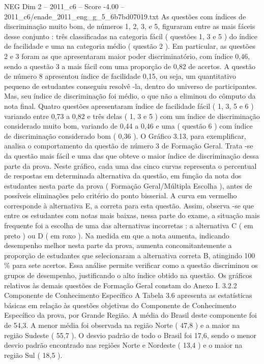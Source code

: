 \begin{textsample}{NEG Dim 2 – 2011\_c6 – Score -4.00 – 2011\_c6/enade\_2011\_eng\_g\_5\_6b7bd07019.txt}
As questões com índices de discriminação muito bom, de números 1, 2, 3, e 5, figuraram entre as mais fáceis desse conjunto : três classificadas na categoria fácil ( questões 1, 3 e 5 ) do índice de facilidade e uma na categoria médio ( questão 2 ).
Em particular, as questões 2 e 3 foram as que apresentaram maior poder discriminatório, com índice 0,46, sendo a questão 3 a mais fácil com uma proporção de 0,82 de acertos.
A questão de número 8 apresentou índice de facilidade 0,15, ou seja, um quantitativo pequeno de estudantes conseguiu resolvê -la, dentro do universo de participantes.
Mas, seu índice de discriminação foi médio, o que não a eliminou do cômputo da nota final.
Quatro questões apresentaram índice de facilidade fácil ( 1, 3, 5 e 6 ) variando entre 0,73 a 0,82 e três delas ( 1, 3 e 5 ) com um índice de discriminação considerado muito bom, variando de 0,44 a 0,46 e uma ( questão 6 ) com índice de discriminação considerado bom ( 0,36 ).
O Gráfico 3.13, para exemplificar, analisa o comportamento da questão de número 3 de Formação Geral.
Trata -se da questão mais fácil e uma das que obteve o maior índice de discriminação dessa parte da prova.
Neste gráfico, cada uma das cinco curvas representa o percentual de respostas em determinada alternativa da questão, em função da nota dos estudantes nesta parte da prova ( Formação Geral/Múltipla Escolha ), antes de possíveis eliminações pelo critério do ponto bisserial.
A curva em vermelho corresponde à alternativa E, a correta para esta questão.
Assim, observa -se que entre os estudantes com notas mais baixas, nessa parte do exame, a situação mais frequente foi a escolha de uma das alternativas incorretas : a alternativa C ( em preto ) ou D ( em roxo ).
Na medida em que a nota aumenta, indicando desempenho melhor nesta parte da prova, aumenta concomitantemente a proporção de estudantes que selecionaram a alternativa correta B, atingindo 100 \% para sete acertos.
Essa análise permite verificar como a questão discriminou os grupos de desempenho, justificando o alto índice obtido na questão.
Os gráficos relativos às demais questões de Formação Geral constam do Anexo I. 3.2.2 Componente de Conhecimento Específico A Tabela 3.6 apresenta as estatísticas básicas em relação às questões objetivas do Componente de Conhecimento Específico da prova, por Grande Região.
A média do Brasil deste componente foi de 54,3.
A menor média foi observada na região Norte ( 47,8 ) e a maior na região Sudeste ( 55,7 ).
O desvio padrão de todo o Brasil foi 17,6, sendo o menor desvio padrão encontrado nas regiões Norte e Nordeste ( 13,4 ) e o maior na região Sul ( 18,5 ).

\end{textsample}
